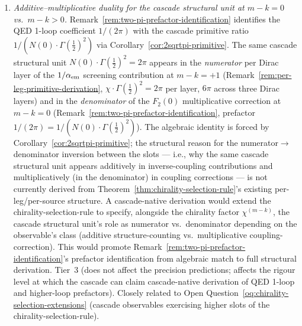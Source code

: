 \documentclass[12pt,a4paper]{article}
\begin{document}
\begin{enumerate}
\item\label{oq:additive-multiplicative-duality} \emph{Additive--multiplicative duality for the cascade structural unit at $m-k=0$ vs.\ $m-k>0$.} Remark~\ref{rem:two-pi-prefactor-identification} identifies the QED 1-loop coefficient $1/(2\pi)$ with the cascade primitive ratio $1/(N(0)\cdot\Gamma(\tfrac{1}{2})^2)$ via Corollary~\ref{cor:2sqrtpi-primitive}. The same cascade structural unit $N(0)\cdot\Gamma(\tfrac{1}{2})^2 = 2\pi$ appears in the \emph{numerator} per Dirac layer of the $1/\alpha_{\rm em}$ screening contribution at $m-k=+1$ (Remark~\ref{rem:per-leg-primitive-derivation}, $\chi\cdot\Gamma(\tfrac{1}{2})^2 = 2\pi$ per layer, $6\pi$ across three Dirac layers) and in the \emph{denominator} of the $F_2(0)$ multiplicative correction at $m-k=0$ (Remark~\ref{rem:two-pi-prefactor-identification}, prefactor $1/(2\pi) = 1/(N(0)\cdot\Gamma(\tfrac{1}{2})^2)$). The algebraic identity is forced by Corollary~\ref{cor:2sqrtpi-primitive}; the structural reason for the numerator$\to$denominator inversion between the slots --- i.e., why the same cascade structural unit appears additively in inverse-coupling contributions and multiplicatively (in the denominator) in coupling corrections --- is not currently derived from Theorem~\ref{thm:chirality-selection-rule}'s existing per-leg/per-source structure. A cascade-native derivation would extend the chirality-selection-rule to specify, alongside the chirality factor $\chi^{(m-k)}$, the cascade structural unit's role as numerator vs.\ denominator depending on the observable's class (additive structure-counting vs.\ multiplicative coupling-correction). This would promote Remark~\ref{rem:two-pi-prefactor-identification}'s prefactor identification from algebraic match to full structural derivation. Tier~3 (does not affect the precision predictions; affects the rigour level at which the cascade can claim cascade-native derivation of QED 1-loop and higher-loop prefactors). Closely related to Open Question~\ref{oq:chirality-selection-extensions} (cascade observables exercising higher slots of the chirality-selection-rule).


\end{enumerate}
\end{document}
